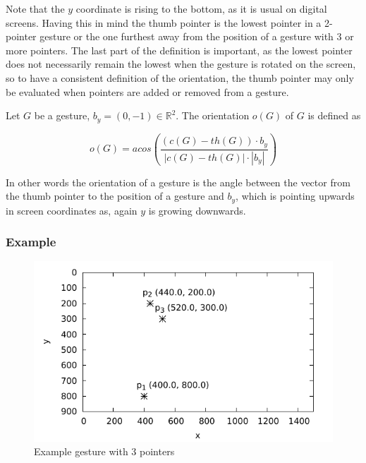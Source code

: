 Note that the $y$ coordinate is rising to the bottom, as it is usual on digital screens. Having this in mind the thumb pointer is the lowest pointer in a 2-pointer gesture or the one furthest away from the position of a gesture with 3 or more pointers. The last part of the definition is important, as the lowest pointer does not necessarily remain the lowest when the gesture is rotated on the screen, so to have a consistent definition of the orientation, the thumb pointer may only be evaluated when pointers are added or removed from a gesture.

\begin{defn}
	Let $G$ be a gesture, $b_y = (0, -1) \in \mathbb{R}^2$. The orientation $o(G)$ of $G$ is defined as
	
\begin{equation}
o(G) = acos\left(\frac{(c(G) - th(G)) \cdot b_y}{|c(G) - th(G)| \cdot |b_y|}\right)
\end{equation}	
	
\end{defn}

In other words the orientation of a gesture is the angle between the vector from the thumb pointer to the position of a gesture and $b_y$, which is pointing upwards in screen coordinates as, again $y$ is growing downwards.

\subsubsection{Example}

\begin{figure}
	\caption{\label{fig:touch:expl}Example gesture with 3 pointers}
	\includegraphics{assets/chpt_concepts/gestures/3pointers_blank.pdf}
\end{figure}

